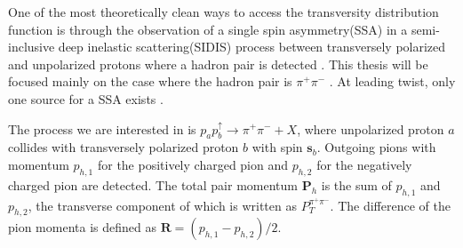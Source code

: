 \documentclass[letterpaper, abstract = on,listof=totoc, bibliography=totoc]{scrreprt}
\newcommand{\ptpair}{P_{T}^{\pi^+\pi^-}}
\newcommand{\pip}{\pi^+}
\newcommand{\pim}{\pi^-}
\newcommand{\pair}{$\pip\pim$ }
\begin{document}
One of the most theoretically clean ways to access the transversity distribution function is through the observation of a single spin asymmetry(SSA) in a semi-inclusive deep inelastic scattering(SIDIS) process between transversely polarized and unpolarized protons where a hadron pair is detected \cite{bacchettaRadici2}. This thesis will be focused mainly on the case where the hadron pair is \pair. At leading twist, only one source for a SSA exists \cite{bacchettaRadici2}. 

The process we are interested in is $p_ap_b^\uparrow \rightarrow \pi^+\pi^- + X$, where unpolarized proton $a$ collides with transversely polarized proton $b$ with spin $\boldsymbol{s}_b$. Outgoing pions with momentum $p_{h,1}$ for the positively charged pion and $p_{h,2}$ for the negatively charged pion are detected. The total pair momentum $\bm{P}_h$ is the sum of $p_{h,1}$ and $p_{h,2}$, the transverse component of which is written as $\ptpair$. 
 The difference of the pion momenta is defined as $\bm{R}= (p_{h,1}-p_{h,2})/2$.
\end{document}
